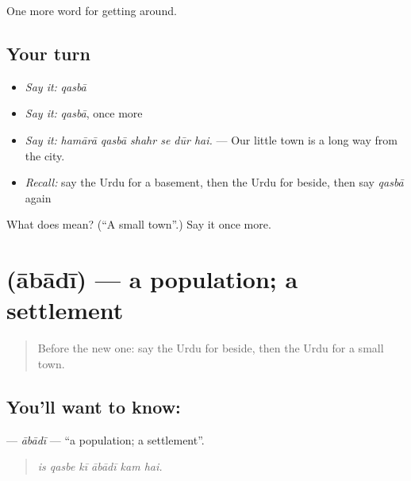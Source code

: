 \begin{grammarlens}[title={What you've built}]
One more word for getting around.
\end{grammarlens}

\subsection*{Your turn}
\begin{itemize}
\raggedright
  \item \emph{Say it:} \emph{qasbā}
  \item \emph{Say it:} \emph{qasbā}, once more
  \item \emph{Say it:} \emph{hamārā qasbā shahr se dūr hai.} — Our little town is a long way from the city.
  \item \emph{Recall:} say the Urdu for a basement, then the Urdu for beside, then say \emph{qasbā} again
\end{itemize}

\begin{tcolorbox}[breakable,colback=teal!4,colframe=teal!35!black,title={Before you move on}]
What does  mean? (\textquotedblleft{}A small town\textquotedblright{}.) Say it once more.
\end{tcolorbox}
\section[\texorpdfstring{\ur{آبادی} (ābādī)}{آبادی (ābādī)}]{ (ābādī) — a population; a settlement}

\label{lesson:UR-C412-abadi}



\begin{quote}
Before the new one: say the Urdu for beside, then the Urdu for a small town.
\end{quote}

\subsection*{You'll want to know: }
\textbf{} — \emph{ābādī} — \textquotedblleft{}a population; a settlement\textquotedblright{}.

\begin{quote}
     
\end{quote}

\begin{quote}
\emph{is qasbe kī ābādī kam hai.}
\end{quote}

